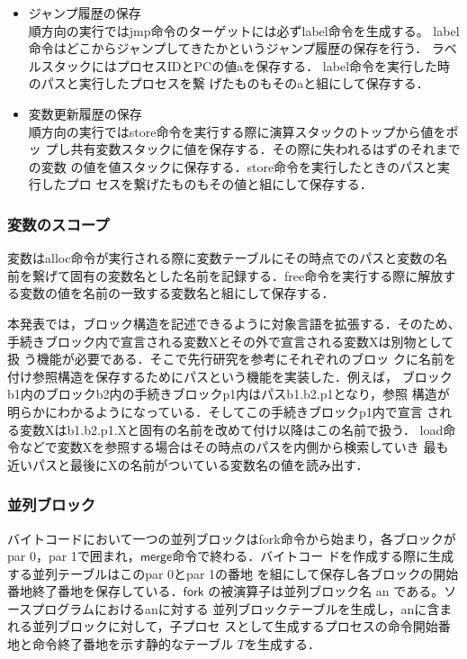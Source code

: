 \documentclass[submit,PRO]{ipsj}
\newcommand{\bcode}[1]{$\mathsf{#1}$}
\begin{document}
\begin{itemize}
 \item ジャンプ履歴の保存\\
順方向の実行ではjmp命令のターゲットには必ずlabel命令を生成する。
label命令はどこからジャンプしてきたかというジャンプ履歴の保存を行う．
ラベルスタックにはプロセスIDとPCの値aを保存する．
label命令を実行した時のパスと実行したプロセスを繋
げたものもそのaと組にして保存する．
\item 変数更新履歴の保存\\
順方向の実行ではstore命令を実行する際に演算スタックのトップから値をポッ
プし共有変数スタックに値を保存する．その際に失われるはずのそれまでの変数
の値を値スタックに保存する．store命令を実行したときのパスと実行したプロ
セスを繋げたものもその値と組にして保存する．
\end{itemize}

\subsubsection{変数のスコープ}

変数はalloc命令が実行される際に変数テーブルにその時点でのパスと変数の名
前を繋げて固有の変数名とした名前を記録する．free命令を実行する際に解放す
る変数の値を名前の一致する変数名と組にして保存する．

本発表では，ブロック構造を記述できるように対象言語を拡張する．そのため、
手続きブロック内で宣言される変数Xとその外で宣言される変数Xは別物として扱
う機能が必要である．そこで先行研究\cite{DBLP:journals/corr/abs-1808-08651,Hoey20PHD}を参考にそれぞれのブロッ
クに名前を付け参照構造を保存するためにパスという機能を実装した．例えば，
ブロックb1内のブロックb2内の手続きブロックp1内はパスb1.b2.p1となり，参照
構造が明らかにわかるようになっている．そしてこの手続きブロックp1内で宣言
される変数Xはb1.b2.p1.Xと固有の名前を改めて付け以降はこの名前で扱う．
load命令などで変数Xを参照する場合はその時点のパスを内側から検索していき
最も近いパスと最後にXの名前がついている変数名の値を読み出す．

\subsubsection{並列ブロック}

バイトコードにおいて一つの並列ブロックはfork命令から始まり，各ブロックが
{\sf par 0}，{\sf par 1}で囲まれ，\bcode{merge}命令で終わる．バイトコー
ドを作成する際に生成する並列テーブルはこの{\sf par 0}と{\sf par 1}の番地
を組にして保存し各ブロックの開始番地終了番地を保存している．\bcode{fork}
の被演算子は並列ブロック名 an である。ソースプログラムにおけるanに対する
並列ブロックテーブルを生成し，anに含まれる並列ブロックに対して，子プロセ
スとして生成するプロセスの命令開始番地と命令終了番地を示す静的なテーブル
$T$を生成する．
\end{document}
